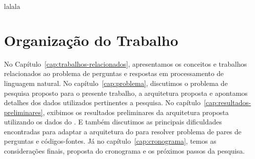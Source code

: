 lalala

\section{Organização do Trabalho}
\label{sec:organizacao_trabalho}

No Capítulo~\ref{cap:trabalhos-relacionados}, apresentamos os conceitos e trabalhos relacionados ao problema de perguntas e respostas em processamento de linguagem natural. No capítulo~\ref{cap:problema}, discutimos o problema de pesquisa proposto para o presente trabalho, a arquitetura proposta e apontamos detalhes dos dados utilizados pertinentes a pesquisa. 
No capítulo~\ref{cap:resultados-preliminares}, exibimos os resultados preliminares da arquitetura proposta utilizando os dados do \cite{yao-2018}. E também discutimos as principais dificuldades encontradas para adaptar a arquitetura do \cite{feng-2015} para resolver problema de pares de perguntas e códigos-fontes. Já no capítulo~\ref{cap:cronograma}, temos as considerações finais, proposta do cronograma e os próximos passos da pesquisa.
